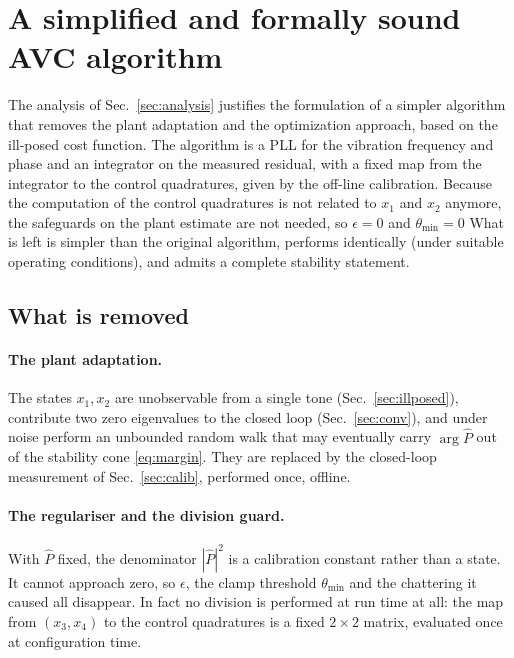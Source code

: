 \documentclass[11pt]{article}
\begin{document}
%

\section{A simplified and formally sound AVC algorithm}
\label{sec:simplified}

The analysis of Sec.~\ref{sec:analysis} justifies the formulation of a simpler algorithm that removes the plant adaptation and the optimization approach, based on the ill-posed cost function. The algorithm is a PLL for the vibration frequency and phase and an integrator on the measured residual, with a fixed map from the integrator to the control quadratures, given by the off-line calibration.
%
Because the computation of the control quadratures is not related to $x_1$ and $x_2$ anymore, the safeguards on the plant estimate are not needed, so $\epsilon = 0$ and $\theta_{\min} = 0$
%
What is left is simpler than the original algorithm, performs identically (under suitable operating conditions), and admits a complete stability statement.

\subsection{What is removed}

\paragraph{The plant adaptation.}
The states $x_1,x_2$ are unobservable from a single tone (Sec.~\ref{sec:illposed}), contribute two zero eigenvalues to the closed loop (Sec.~\ref{sec:conv}), and under noise perform an unbounded random walk that may eventually carry $\arg\hat P$ out of the stability cone \eqref{eq:margin}.
%
They are replaced by the closed-loop measurement of Sec.~\ref{sec:calib}, performed once, offline.

\paragraph{The regulariser and the division guard.}
With $\hat P$ fixed, the denominator $|\hat P|^2$ is a calibration constant rather than a state.
%
It cannot approach zero, so $\epsilon$, the clamp threshold $\theta_{\min}$ and the chattering it caused all disappear.
%
In fact no division is performed at run time at all: the map from $(x_3,x_4)$ to the control quadratures is a fixed $2\times2$ matrix, evaluated once at configuration time.
\end{document}
